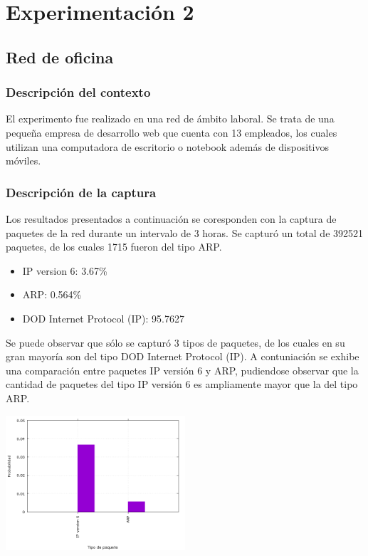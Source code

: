 \section{Experimentaci\'on 2}

\subsection{Red de oficina}

\subsubsection{Descripci\'on del contexto}
El experimento fue realizado en una red de ámbito laboral. Se trata de una pequeña empresa de desarrollo web que cuenta con 13 empleados, los cuales utilizan una computadora de escritorio o notebook además de dispositivos móviles.

\subsubsection{Descripci\'on de la captura}
Los resultados presentados a continuación se coresponden con la captura de paquetes de la red durante un intervalo de 3 horas.
Se capturó un total de 392521 paquetes, de los cuales 1715 fueron del tipo ARP.
\begin{itemize}
\item IP version 6: 3.67\%
\item ARP: 0.564\%
\item DOD Internet Protocol (IP): 95.7627%
\end{itemize}
Se puede observar que sólo se capturó 3 tipos de paquetes, de los cuales en su gran mayoría son del tipo DOD Internet Protocol (IP).
A contuniación se exhibe una comparación entre paquetes IP versión 6 y ARP, pudiendose observar que la cantidad de paquetes del tipo IP versión 6 es ampliamente mayor que la del tipo ARP.
\begin{center}
\includegraphics[width=0.5\textwidth]{exp2-graficos/grafico1exp2.png}
\end{center}

